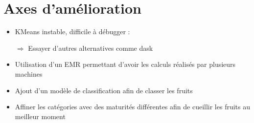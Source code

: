 \documentclass[8pt,aspectratio=169,hyperref={unicode=true}]{beamer}
\begin{document}
\section{Axes d'amélioration}
\begin{frame}{\insertsection}
  \begin{itemize}
    \item KMeans instable, difficile à débugger :
    \item[$\Rightarrow$] Essayer d'autres alternatives comme dask
    \item[]
    \item Utilisation d'un EMR permettant d'avoir les calculs réalisés par plusieurs machines
    \item[]
    \item Ajout d'un modèle de classification afin de classer les fruits
    \item[]
    \item Affiner les catégories avec des maturités différentes afin de cueillir les fruits au meilleur moment
  \end{itemize}
\end{frame}
\end{document}
